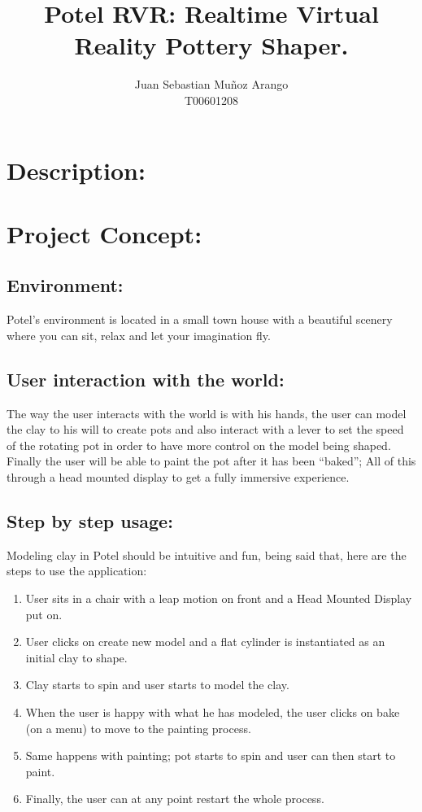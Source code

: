 \documentclass{article}
\begin{document}
\title{Potel RVR: Realtime Virtual Reality Pottery Shaper.}

\author{Juan Sebastian Mu\~noz Arango \\ T00601208}
\maketitle %

\section{Description:}

\section{Project Concept:}
\subsection{Environment:}
Potel's environment is located in a small town house with a beautiful scenery where
you can sit, relax and let your imagination fly.
\subsection{User interaction with the world:}
The way the user interacts with the world is with his hands, the user can
model the clay to his will to create pots and also interact with a lever to
set the speed of the rotating pot in order to have more control on the model
being shaped. Finally the user will be able to paint the pot after it has
been ``baked''; All of this through a head mounted display to get a fully
immersive experience.
\subsection{Step by step usage:}
Modeling clay in Potel should be intuitive and fun, being said that, here are
the steps to use the application:
\begin{enumerate}
\item User sits in a chair with a leap motion on front and a Head Mounted
  Display put on.
\item User clicks on create new model and a flat cylinder is
  instantiated as an initial clay to shape.
\item Clay starts to spin and user starts to model the clay.
\item When the user is happy with what he has modeled, the user clicks on
  bake (on a menu) to move to the painting process.
\item Same happens with painting; pot starts to spin and user can then start
  to paint.
\item Finally, the user can at any point restart the whole process.
\end{enumerate}
\end{document}
